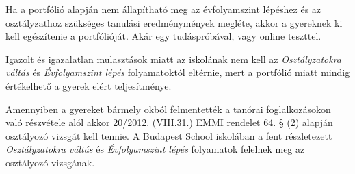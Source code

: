 Ha a portfólió alapján nem állapítható meg az évfolyamszint lépéshez és az osztályzathoz szükséges tanulási eredménymények megléte, akkor a gyereknek ki kell egészítenie a portfólióját. Akár egy tudáspróbával, vagy online teszttel.

Igazolt és igazalatlan mulasztások miatt az iskolának nem kell az \emph{Osztályzatokra váltás} és \emph{Évfolyamszint lépés} folyamatoktól eltérnie, mert a portfólió miatt mindig értékelhető a gyerek elért teljesítménye.

Amennyiben a gyereket bármely okból felmentették a tanórai foglalkozásokon való részvétele alól akkor 20/2012. (VIII.31.) EMMI rendelet 64. § (2)  alapján osztályozó vizsgát kell tennie. A Budapest School iskolában a fent részletezett \emph{Osztályzatokra váltás} és \emph{Évfolyamszint lépés} folyamatok  felelnek meg az osztályozó vizsgának.
